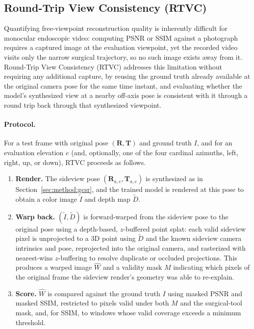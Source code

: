 \subsection{Round-Trip View Consistency (RTVC)}
\label{sec:method:rtvc}

Quantifying free-viewpoint reconstruction quality is inherently difficult
for monocular endoscopic video: computing PSNR or SSIM against a
photograph requires a captured image at the evaluation viewpoint, yet the
recorded video visits only the narrow surgical trajectory, so no such
image exists away from it. Round-Trip View Consistency (RTVC) addresses
this limitation without requiring any additional capture, by reusing the
ground truth already available at the original camera pose for the same
time instant, and evaluating whether the model's synthesized view at a
nearby off-axis pose is consistent with it through a round trip back
through that synthesized viewpoint.

\paragraph{Protocol.}
For a test frame with original pose $(\mathbf{R}, \mathbf{T})$ and ground
truth $I$, and for an evaluation elevation $e$ (and, optionally, one of the
four cardinal azimuths, left, right, up, or down), RTVC proceeds as
follows.
\begin{enumerate}
\item \textbf{Render.} The sideview pose $(\mathbf{R}_{a,e},
\mathbf{T}_{a,e})$ is synthesized as in Section~\ref{sec:method:gcsr}, and
the trained model is rendered at this pose to obtain a color image
$\tilde{I}$ and depth map $\tilde{D}$.
\item \textbf{Warp back.} $(\tilde{I}, \tilde{D})$ is forward-warped from
the sideview pose to the original pose using a depth-based, $z$-buffered
point splat: each valid sideview pixel is unprojected to a 3D point using
$\tilde{D}$ and the known sideview camera intrinsics and pose, reprojected
into the original camera, and rasterized with nearest-wins $z$-buffering to
resolve duplicate or occluded projections. This produces a warped image
$\hat{W}$ and a validity mask $M$ indicating which pixels of the original
frame the sideview render's geometry was able to re-explain.
\item \textbf{Score.} $\hat{W}$ is compared against the ground truth $I$
using masked PSNR and masked SSIM, restricted to pixels valid under both
$M$ and the surgical-tool mask, and, for SSIM, to windows whose valid
coverage exceeds a minimum threshold.
\end{enumerate}

